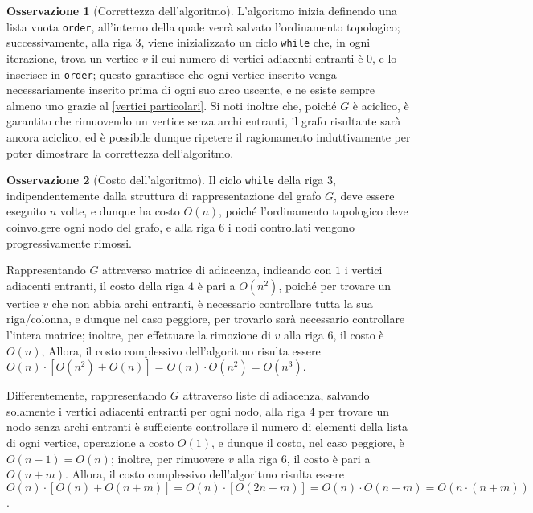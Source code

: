 \documentclass[14pt]{extreport}
\theoremstyle{definition}
\theoremstyle{definition}
\newtheorem{remark}{Osservazione}[subsection]
\begin{document}
\begin{remark}[Correttezza dell'algoritmo]
    L'algoritmo inizia definendo una lista vuota \texttt{order}, all'interno della quale verrà salvato l'ordinamento topologico; successivamente, alla riga $3$, viene inizializzato un ciclo \texttt{while} che, in ogni iterazione, trova un vertice $v$ il cui numero di vertici adiacenti entranti è $0$, e lo inserisce in \texttt{order}; questo garantisce che ogni vertice inserito venga necessariamente inserito prima di ogni suo arco uscente, e ne esiste sempre almeno uno grazie al \cref{vertici particolari}. Si noti inoltre che, poiché $G$ è aciclico, è garantito che rimuovendo un vertice senza archi entranti, il grafo risultante sarà ancora aciclico, ed è possibile dunque ripetere il ragionamento induttivamente per poter dimostrare la correttezza dell'algoritmo.
\end{remark}

\begin{remark}[Costo dell'algoritmo]
    Il ciclo \texttt{while} della riga $3$, indipendentemente dalla struttura di rappresentazione del grafo $G$, deve essere eseguito $n$ volte, e dunque ha costo $O(n)$, poiché l'ordinamento topologico deve coinvolgere ogni nodo del grafo, e alla riga $6$ i nodi controllati vengono progressivamente rimossi.

    Rappresentando $G$ attraverso matrice di adiacenza, indicando con $1$ i vertici adiacenti entranti, il costo della riga $4$ è pari a $O(n^2)$, poiché per trovare un vertice $v$ che non abbia archi entranti, è necessario controllare tutta la sua riga/colonna, e dunque nel caso peggiore, per trovarlo sarà necessario controllare l'intera matrice; inoltre, per effettuare la rimozione di $v$ alla riga $6$, il costo è $O(n)$, Allora, il costo complessivo dell'algoritmo risulta essere $O(n) \cdot [O(n^2) + O(n)]= O(n) \cdot O(n^2) = O(n^3)$.

    Differentemente, rappresentando $G$ attraverso liste di adiacenza, salvando solamente i vertici adiacenti entranti per ogni nodo, alla riga $4$ per trovare un nodo senza archi entranti è sufficiente controllare il numero di elementi della lista di ogni vertice, operazione a costo $O(1)$, e dunque il costo, nel caso peggiore, è $O(n - 1) = O(n)$; inoltre, per rimuovere $v$ alla riga $6$, il costo è pari a $O(n + m)$. Allora, il costo complessivo dell'algoritmo risulta essere $O(n) \cdot [O(n) + O(n + m)] = O(n) \cdot [O(2n + m)] = O(n) \cdot O(n + m) = O(n \cdot (n +m))$.
\end{remark}
\end{document}
